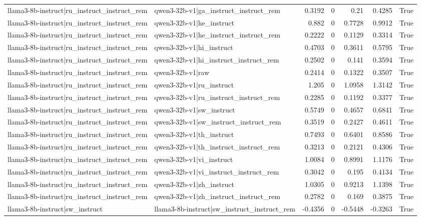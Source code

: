 \begin{table}
\begin{tabular}{l l r r r r l}
llama3-8b-instruct|ru_instruct_instruct_rem & qwen3-32b-v1|ga_instruct_instruct_rem & 0.3192 & 0 & 0.21 & 0.4285 & True \\
llama3-8b-instruct|ru_instruct_instruct_rem & qwen3-32b-v1|he_instruct & 0.882 & 0 & 0.7728 & 0.9912 & True \\
llama3-8b-instruct|ru_instruct_instruct_rem & qwen3-32b-v1|he_instruct_instruct_rem & 0.2222 & 0 & 0.1129 & 0.3314 & True \\
llama3-8b-instruct|ru_instruct_instruct_rem & qwen3-32b-v1|hi_instruct & 0.4703 & 0 & 0.3611 & 0.5795 & True \\
llama3-8b-instruct|ru_instruct_instruct_rem & qwen3-32b-v1|hi_instruct_instruct_rem & 0.2502 & 0 & 0.141 & 0.3594 & True \\
llama3-8b-instruct|ru_instruct_instruct_rem & qwen3-32b-v1|raw & 0.2414 & 0 & 0.1322 & 0.3507 & True \\
llama3-8b-instruct|ru_instruct_instruct_rem & qwen3-32b-v1|ru_instruct & 1.205 & 0 & 1.0958 & 1.3142 & True \\
llama3-8b-instruct|ru_instruct_instruct_rem & qwen3-32b-v1|ru_instruct_instruct_rem & 0.2285 & 0 & 0.1192 & 0.3377 & True \\
llama3-8b-instruct|ru_instruct_instruct_rem & qwen3-32b-v1|sw_instruct & 0.5749 & 0 & 0.4657 & 0.6841 & True \\
llama3-8b-instruct|ru_instruct_instruct_rem & qwen3-32b-v1|sw_instruct_instruct_rem & 0.3519 & 0 & 0.2427 & 0.4611 & True \\
llama3-8b-instruct|ru_instruct_instruct_rem & qwen3-32b-v1|th_instruct & 0.7493 & 0 & 0.6401 & 0.8586 & True \\
llama3-8b-instruct|ru_instruct_instruct_rem & qwen3-32b-v1|th_instruct_instruct_rem & 0.3213 & 0 & 0.2121 & 0.4306 & True \\
llama3-8b-instruct|ru_instruct_instruct_rem & qwen3-32b-v1|vi_instruct & 1.0084 & 0 & 0.8991 & 1.1176 & True \\
llama3-8b-instruct|ru_instruct_instruct_rem & qwen3-32b-v1|vi_instruct_instruct_rem & 0.3042 & 0 & 0.195 & 0.4134 & True \\
llama3-8b-instruct|ru_instruct_instruct_rem & qwen3-32b-v1|zh_instruct & 1.0305 & 0 & 0.9213 & 1.1398 & True \\
llama3-8b-instruct|ru_instruct_instruct_rem & qwen3-32b-v1|zh_instruct_instruct_rem & 0.2782 & 0 & 0.169 & 0.3875 & True \\
llama3-8b-instruct|sw_instruct & llama3-8b-instruct|sw_instruct_instruct_rem & -0.4356 & 0 & -0.5448 & -0.3263 & True \\

\end{tabular}
\end{table}
